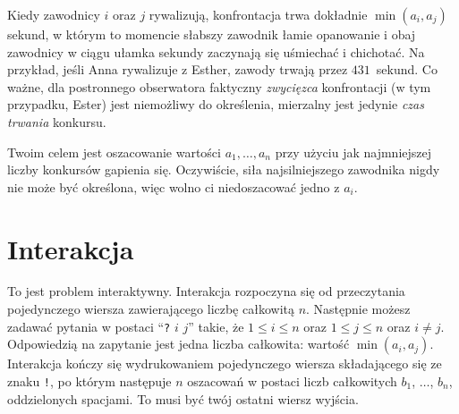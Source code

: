\medskip
Kiedy zawodnicy $i$ oraz $j$ rywalizują, konfrontacja trwa dokładnie $\min(a_i, a_j)$ sekund, w którym to momencie słabszy zawodnik łamie opanowanie i obaj zawodnicy w ciągu ułamka sekundy zaczynają się uśmiechać i chichotać.
Na przykład, jeśli Anna rywalizuje z Esther, zawody trwają przez $431$~sekund.
Co ważne, dla postronnego obserwatora faktyczny \emph{zwycięzca} konfrontacji (w tym przypadku, Ester) jest niemożliwy do określenia, mierzalny jest jedynie \emph{czas trwania} konkursu.

Twoim celem jest oszacowanie wartości $a_1,\ldots, a_n$ przy użyciu jak najmniejszej liczby konkursów gapienia się.
Oczywiście, siła najsilniejszego zawodnika nigdy nie może być określona, więc wolno ci niedoszacować jedno z $a_i$.

\section*{Interakcja}

To jest problem interaktywny.
Interakcja rozpoczyna się od przeczytania pojedynczego wiersza zawierającego liczbę całkowitą $n$.
Następnie możesz zadawać pytania w postaci ``\texttt{?} $i$ $j$'' takie, że $1\leq i\leq n$ oraz $1\leq j\leq n$ oraz $i\neq j$.
Odpowiedzią na zapytanie jest jedna liczba całkowita: wartość $\min(a_i, a_j)$.
Interakcja kończy się wydrukowaniem pojedynczego wiersza składającego się ze znaku \texttt{!}, po którym następuje $n$ oszacowań w postaci liczb całkowitych $b_1$, $\ldots$, $b_n$, oddzielonych spacjami.
To musi być twój ostatni wiersz wyjścia.

